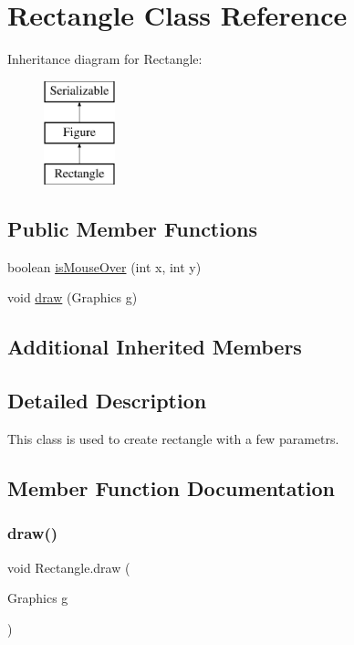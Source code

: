 \hypertarget{class_rectangle}{}\section{Rectangle Class Reference}
\label{class_rectangle}
Inheritance diagram for Rectangle\+:\begin{figure}[H]
\begin{center}
\leavevmode
\includegraphics[height=3.000000cm]{class_rectangle}
\end{center}
\end{figure}
\subsection*{Public Member Functions}
\begin{DoxyCompactItemize}
\item 
boolean \mbox{\hyperlink{class_rectangle_a2dc2283bb83f83c589d14984116f098b}{is\+Mouse\+Over}} (int x, int y)
\item 
void \mbox{\hyperlink{class_rectangle_ae4c3ecbd65d2e84b8a62add8687b73ad}{draw}} (Graphics g)
\end{DoxyCompactItemize}
\subsection*{Additional Inherited Members}


\subsection{Detailed Description}
This class is used to create rectangle with a few parametrs. 

\subsection{Member Function Documentation}
\mbox{\label{class_rectangle_ae4c3ecbd65d2e84b8a62add8687b73ad}} 
\subsubsection{\texorpdfstring{draw()}{draw()}}
{\footnotesize\ttfamily void Rectangle.\+draw (\begin{DoxyParamCaption}\item[{Graphics}]{g }\end{DoxyParamCaption})}

